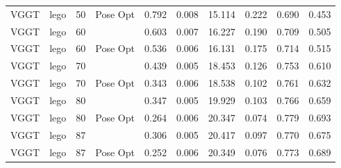\begin{table}[H]
\begin{tabular}{llrlrrrrrr}
VGGT & lego & 50 & Pose Opt & 0.792 & 0.008 & 15.114 & 0.222 & 0.690 & 0.453 \\
VGGT & lego & 60 &  & 0.603 & 0.007 & 16.227 & 0.190 & 0.709 & 0.505 \\
VGGT & lego & 60 & Pose Opt & 0.536 & 0.006 & 16.131 & 0.175 & 0.714 & 0.515 \\
VGGT & lego & 70 &  & 0.439 & 0.005 & 18.453 & 0.126 & 0.753 & 0.610 \\
VGGT & lego & 70 & Pose Opt & 0.343 & 0.006 & 18.538 & 0.102 & 0.761 & 0.632 \\
VGGT & lego & 80 &  & 0.347 & 0.005 & 19.929 & 0.103 & 0.766 & 0.659 \\
VGGT & lego & 80 & Pose Opt & 0.264 & 0.006 & 20.347 & 0.074 & 0.779 & 0.693 \\
VGGT & lego & 87 &  & 0.306 & 0.005 & 20.417 & 0.097 & 0.770 & 0.675 \\
VGGT & lego & 87 & Pose Opt & 0.252 & 0.006 & 20.349 & 0.076 & 0.773 & 0.689 \\
\bottomrule
\end{tabular}
\end{table}